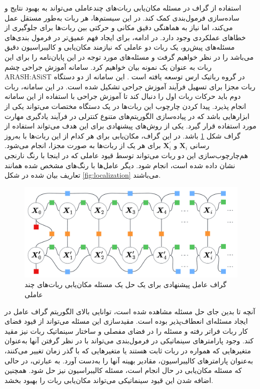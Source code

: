 استفاده از گراف در مسئله مکان‌یابی ربات‌های چندعاملی می‌تواند به بهبود نتایج و ساده‌سازی فرمول‌بندی کمک کند. در این سیستم‌ها، هر ربات به‌طور مستقل عمل می‌کند، اما نیاز به هماهنگی دقیق مکانی و حرکتی بین ربات‌ها برای جلوگیری از خطاهای عملکردی وجود دارد.
در ادامه، برای ایجاد فهم عمیق‌تر در فرمول بندی‌های مسئله‌های پیش‌رو، یک ربات دو عاملی که نیازمند مکان‌یابی و کالیبراسیون دقیق می‌باشد را در نظر خواهیم گرفت و مسئله‌های مورد توجه در این پایان‌نامه را برای این ربات به عنوان یک نمونه بیان خواهیم کرد. سامانه آموزش جراحی چشم 
ARASH:ASiST 
در گروه رباتیک ارس توسعه یافته است
\cite{hassani2021kinematic}. این سامانه از دو دستگاه ربات مجزا برای تسهیل فرآیند آموزش جراحی تشکیل شده است. در این سامانه، ربات دوم باید حرکات ربات اول را دنبال کند تا آموزش جراحی با استفاده از این سامانه انجام پذیرد. پیدا کردن چارچوب این ربات‌ها در یک دستگاه مختصات می‌تواند یکی از ابزارهایی باشد که در پیاده‌سازی الگوریتم‌های متنوع کنترلی در فرآیند یادگیری مهارت مورد استفاده قرار گیرد. یکی از روش‌های پیشنهادی برای این هدف می‌تواند استفاده از گراف شکل 
\ref{fig:arashasistlocalization}
باشد. در این گراف، مکان‌یابی برای هر کدام از این ربات‌ها با به‌روز رسانی
$\boldsymbol{X}_{i}$
و
$\boldsymbol{X}_{i}^{'}$
برای هر یک از ربات‌ها به صورت مجزا، انجام می‌شود. هم‌چارچوب‌سازی این دو ربات می‌تواند توسط قیود عاملی که در اینجا با رنگ نارنجی نشان داده شده است، انجام شود. دیگر عامل‌ها با رنگ‌های مشخص شده همانند تعاریف بیان شده در شکل 
\ref{fig:localization}
می‌باشند. 

\begin{figure}
	\centering
	\includegraphics[width=0.7\linewidth]{img/Arash_Asist_localization}
	\caption{گراف عامل پیشنهادی برای یک حل یک مسئله مکان‌یابی ربات‌های چند عاملی}
	\label{fig:arashasistlocalization}
\end{figure}


آنچه تا بدین جای حل مسئله مشاهده شده است، توانایی بالای الگوریتم گراف عامل در ایجاد مسئله‌ای انعطاف‌پذیر بوده است. مقیدسازی این مسئله می‌تواند از قیود فضای کار ربات فراتر رفته و مسئله را در فضای مفصلی و ساختار سینماتیک ربات نیز مقید کند. وجود پارامترهای سینماتیکی در فرمول‌بندی می‌تواند با در نظر گرفتن آنها به‌عنوان متغیرهایی که همواره در ربات ثابت هستند یا متغیرهایی که با گذر زمان تغییر می‌کنند، به‌عنوان پارامترهای کالیبراسیون، مقادیر بهینه آنها را به‌دست آورد. به عبارتی، در حالی که مسئله مکان‌یابی در حال انجام است، مسئله کالیبراسیون نیز حل شود. همچنین اضافه شدن این قیود سینماتیکی می‌تواند مکان‌یابی ربات را بهبود بخشد.


